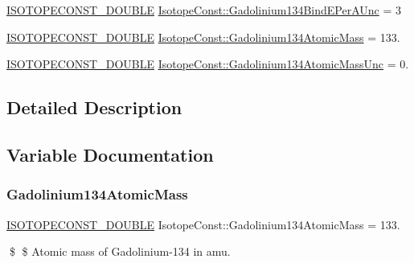 \begin{DoxyCompactItemize}
\mbox{\hyperlink{group___isotope_const-_macros_ga8f45a7272ce02c0b4c65c44636ed719a}{I\+S\+O\+T\+O\+P\+E\+C\+O\+N\+S\+T\+\_\+\+D\+O\+U\+B\+LE}} \mbox{\hyperlink{group___isotope_const-_gadolinium-_gd134_gaa9d91c4be0411a2c70c545694a6252c0}{Isotope\+Const\+::\+Gadolinium134\+Bind\+E\+Per\+A\+Unc}} = 3
\item 
\mbox{\hyperlink{group___isotope_const-_macros_ga8f45a7272ce02c0b4c65c44636ed719a}{I\+S\+O\+T\+O\+P\+E\+C\+O\+N\+S\+T\+\_\+\+D\+O\+U\+B\+LE}} \mbox{\hyperlink{group___isotope_const-_gadolinium-_gd134_gaff19789654e9724409c7ead2d2520f75}{Isotope\+Const\+::\+Gadolinium134\+Atomic\+Mass}} = 133.
\item 
\mbox{\hyperlink{group___isotope_const-_macros_ga8f45a7272ce02c0b4c65c44636ed719a}{I\+S\+O\+T\+O\+P\+E\+C\+O\+N\+S\+T\+\_\+\+D\+O\+U\+B\+LE}} \mbox{\hyperlink{group___isotope_const-_gadolinium-_gd134_ga5076e30a24541cee9a7e798dfcefce33}{Isotope\+Const\+::\+Gadolinium134\+Atomic\+Mass\+Unc}} = 0.
\end{DoxyCompactItemize}


\subsection{Detailed Description}


\subsection{Variable Documentation}
\mbox{\label{group___isotope_const-_gadolinium-_gd134_gaff19789654e9724409c7ead2d2520f75}} 
\subsubsection{\texorpdfstring{Gadolinium134\+Atomic\+Mass}{Gadolinium134AtomicMass}}
{\footnotesize\ttfamily \mbox{\hyperlink{group___isotope_const-_macros_ga8f45a7272ce02c0b4c65c44636ed719a}{I\+S\+O\+T\+O\+P\+E\+C\+O\+N\+S\+T\+\_\+\+D\+O\+U\+B\+LE}} Isotope\+Const\+::\+Gadolinium134\+Atomic\+Mass = 133.}

\$ \$ Atomic mass of Gadolinium-\/134 in amu. \mbox{\label{group___isotope_const-_gadolinium-_gd134_ga5076e30a24541cee9a7e798dfcefce33}} 
